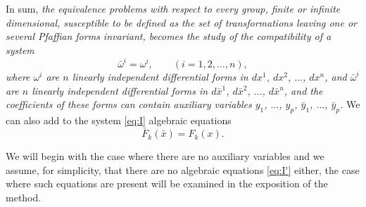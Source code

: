 \documentclass[leqno,11pt]{article}
\theoremstyle{shape1}
\theoremstyle{shape0}
\theoremstyle{shape2}
\theoremstyle{definition}
\begin{document}
\section{}
\label{sec:2}

In sum, \emph{the equivalence problems with respect to every group, finite or infinite dimensional, susceptible to be defined as the set of transformations leaving one or several Pfaffian forms invariant, becomes the study of the compatibility of a system}
\begin{equation}
  \label{eq:I}\tag{I}
  \bar\omega^{i}=\omega^{i},\qquad(i=1,2,\dots,n),
\end{equation}
\emph{where $\omega^{i}$ are $n$ linearly independent differential forms in $dx^{1}$, $dx^{2}$, $\dots$, $dx^{n}$, and $\bar\omega^{i}$ are $n$ linearly independent differential forms in $d\bar x^{1}$, $d\bar x^{2}$, $\dots$, $d\bar x^{n}$, and the coefficients of these forms can contain auxiliary variables $y_{1}$, $\dots$, $y_{p}$, $\bar y_{1}$, $\dots$, $\bar y_{p}$.} We can also add to the system \eqref{eq:I} algebraic equations
\begin{equation}
  \label{eq:I'}\tag{I$'$}
  \bar F_{k}(\bar x)=F_{k}(x).
\end{equation}

We will begin with the case where there are no auxiliary variables and we assume, for simplicity, that there are no algebraic equations \eqref{eq:I'} either, the case where such equations are present will be examined in the exposition of the method.
\end{document}
